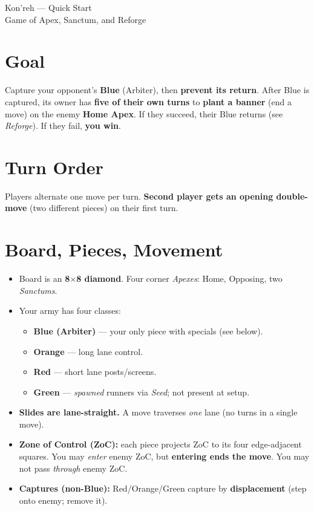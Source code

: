 \documentclass[11pt]{article}
\begin{document}
\begin{center}
{\LARGE Kon'reh --- Quick Start}\\
\vspace{0.25em}
{\small Game of Apex, Sanctum, and Reforge}
\end{center}

\section*{Goal}
Capture your opponent's \textbf{Blue} (Arbiter), then \textbf{prevent its return}. After Blue is captured, its owner has \textbf{five of their own turns} to \textbf{plant a banner} (end a move) on the enemy \textbf{Home Apex}. If they succeed, their Blue returns (see \emph{Reforge}). If they fail, \textbf{you win}. 

\section*{Turn Order}
Players alternate one move per turn. \textbf{Second player gets an opening double-move} (two different pieces) on their first turn.

\section*{Board, Pieces, Movement}
\begin{itemize}
  \item Board is an \textbf{8$\times$8 diamond}. Four corner \emph{Apexes}: Home, Opposing, two \emph{Sanctums}.
  \item Your army has four classes:
    \begin{itemize}
      \item \textbf{Blue (Arbiter)} --- your only piece with specials (see below).
      \item \textbf{Orange} --- long lane control.
      \item \textbf{Red} --- short lane posts/screens.
      \item \textbf{Green} --- \emph{spawned} runners via \emph{Seed}; not present at setup.
    \end{itemize}
  \item \textbf{Slides are lane-straight.} A move traverses \emph{one} lane (no turns in a single move).
  \item \textbf{Zone of Control (ZoC):} each piece projects ZoC to its four edge-adjacent squares. You may \emph{enter} enemy ZoC, but \textbf{entering ends the move}. You may not pass \emph{through} enemy ZoC.
  \item \textbf{Captures (non-Blue):} Red/Orange/Green capture by \textbf{displacement} (step onto enemy; remove it).
\end{itemize}
\end{document}
